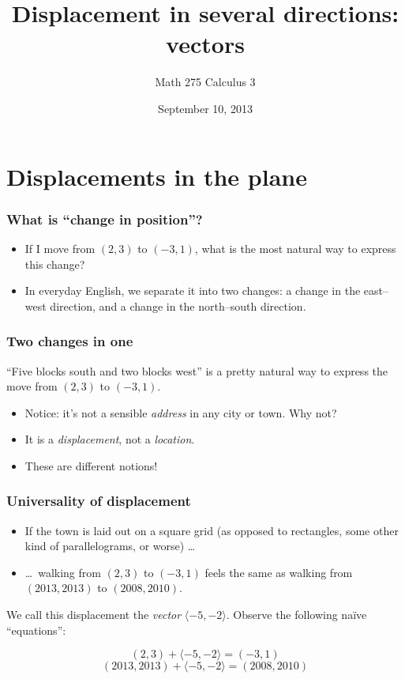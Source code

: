 \documentclass[11pt,ignorenonframetext,aspectratio=169]{beamer}
\title{Displacement in several directions: vectors}
\author{Math 275 Calculus 3}
\date{September 10, 2013 }
\begin{document}
\frame{\titlepage}

\section{Displacements in the plane}

\begin{frame}\frametitle{What is ``change in position''?}

\begin{itemize}[<+->]
\item
  If I move from $(2,3)$ to $(-3, 1)$, what is the most natural way to
  express this change?
\item
  In everyday English, we separate it into two changes: a change in the
  east--west direction, and a change in the north--south direction.
\end{itemize}

\end{frame}

\begin{frame}\frametitle{Two changes in one}

``Five blocks south and two blocks west'' is a pretty natural way to
express the move from $(2,3)$ to $(-3, 1)$.

\begin{itemize}

\item
  Notice: it's not a sensible \emph{address} in any city or town. Why
  not?
\item
  It is a \emph{displacement}, not a \emph{location}.
\item
  These are different notions!
\end{itemize}

\end{frame}

\begin{frame}\frametitle{Universality of displacement}

\begin{itemize}

\item
  If the town is laid out on a square grid (as opposed to rectangles,
  some other kind of parallelograms, or worse) \ldots
\item
  \ldots~walking from $(2,3)$ to $(-3, 1)$ feels the same as walking
  from $(2013,2013)$ to $(2008,2010)$.
\end{itemize}

We call this displacement the \emph{vector} $\langle -5, -2 \rangle$.
Observe the following na\"ive ``equations'':

\begin{equation*}
(2,3) + \langle -5, -2 \rangle = (-3, 1)
\end{equation*}
\begin{equation*}
(2013,2013) + \langle -5, -2 \rangle = (2008,2010)
\end{equation*}

\end{frame}
\end{document}
